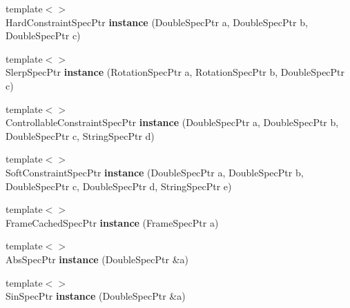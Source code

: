 \begin{DoxyCompactItemize}
\item 
\hypertarget{namespacegiskard__suturo_ac4ab5b3cff858a6294dc57eeb64bcd1b}{{\footnotesize template$<$$>$ }\\Hard\-Constraint\-Spec\-Ptr {\bfseries instance} (Double\-Spec\-Ptr a, Double\-Spec\-Ptr b, Double\-Spec\-Ptr c)}\label{namespacegiskard__suturo_ac4ab5b3cff858a6294dc57eeb64bcd1b}

\item 
\hypertarget{namespacegiskard__suturo_a6208c923961979a6dcd2a11b4ea724b4}{{\footnotesize template$<$$>$ }\\Slerp\-Spec\-Ptr {\bfseries instance} (Rotation\-Spec\-Ptr a, Rotation\-Spec\-Ptr b, Double\-Spec\-Ptr c)}\label{namespacegiskard__suturo_a6208c923961979a6dcd2a11b4ea724b4}

\item 
\hypertarget{namespacegiskard__suturo_a3d341f11577415b0f411e696f76c7100}{{\footnotesize template$<$$>$ }\\Controllable\-Constraint\-Spec\-Ptr {\bfseries instance} (Double\-Spec\-Ptr a, Double\-Spec\-Ptr b, Double\-Spec\-Ptr c, String\-Spec\-Ptr d)}\label{namespacegiskard__suturo_a3d341f11577415b0f411e696f76c7100}

\item 
\hypertarget{namespacegiskard__suturo_afa8445e1082c53c583d525d28d767032}{{\footnotesize template$<$$>$ }\\Soft\-Constraint\-Spec\-Ptr {\bfseries instance} (Double\-Spec\-Ptr a, Double\-Spec\-Ptr b, Double\-Spec\-Ptr c, Double\-Spec\-Ptr d, String\-Spec\-Ptr e)}\label{namespacegiskard__suturo_afa8445e1082c53c583d525d28d767032}

\item 
\hypertarget{namespacegiskard__suturo_aa3688c0d2b54a15000e511cb9d54562d}{{\footnotesize template$<$$>$ }\\Frame\-Cached\-Spec\-Ptr {\bfseries instance} (Frame\-Spec\-Ptr a)}\label{namespacegiskard__suturo_aa3688c0d2b54a15000e511cb9d54562d}

\item 
\hypertarget{namespacegiskard__suturo_ac2bc5149ea2ac47f547b25b4be628e2b}{{\footnotesize template$<$$>$ }\\Abs\-Spec\-Ptr {\bfseries instance} (Double\-Spec\-Ptr \&a)}\label{namespacegiskard__suturo_ac2bc5149ea2ac47f547b25b4be628e2b}

\item 
\hypertarget{namespacegiskard__suturo_ab35a782c8c86ba7ac856e7bf2505fb4c}{{\footnotesize template$<$$>$ }\\Sin\-Spec\-Ptr {\bfseries instance} (Double\-Spec\-Ptr \&a)}\label{namespacegiskard__suturo_ab35a782c8c86ba7ac856e7bf2505fb4c}


\end{DoxyCompactItemize}
